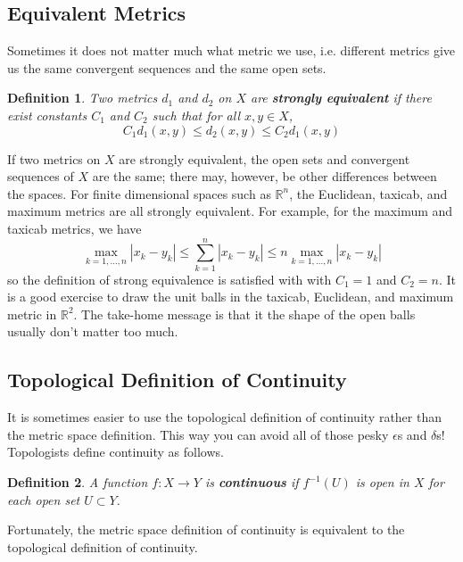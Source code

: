 \documentclass[12pt]{amsart}         %
\newtheorem{definition}{Definition}[section]
\theoremstyle{remark}
\newcommand{\R}{\mathbb{R}}
\begin{document}
\subsection{Equivalent Metrics}

Sometimes it does not matter much what metric we use, i.e. different metrics give us the same convergent sequences and the same open sets. 

\begin{definition}
Two metrics $d_1$ and $d_2$ on $X$ are \textbf{strongly equivalent} if there exist constants $C_1$ and $C_2$ such that for all $x, y \in X$,
\[
C_1 d_1(x,y) \leq d_2(x,y) \leq C_2 d_1(x,y)
\]
\end{definition}

If two metrics on $X$ are strongly equivalent, the open sets and convergent sequences of $X$ are the same; there may, however, be other differences between the spaces. For finite dimensional spaces such as $\R^n$, the Euclidean, taxicab, and maximum metrics are all strongly equivalent. For example, for the maximum and taxicab metrics, we have
\[
\max_{k=1, \dots, n}|x_k - y_k| \leq \sum_{k=1}^n |x_k - y_k| \leq n \max_{k=1, \dots, n}|x_k - y_k|
\]
so the definition of strong equivalence is satisfied with with $C_1 = 1$ and $C_2 = n$. It is a good exercise to draw the unit balls in the taxicab, Euclidean, and maximum metric in $\R^2$. The take-home message is that it the shape of the open balls usually don't matter too much.

\subsection{Topological Definition of Continuity}

It is sometimes easier to use the topological definition of continuity rather than the metric space definition. This way you can avoid all of those pesky $\epsilon$s and $\delta$s! Topologists define continuity as follows.

\begin{definition}
A function $f: X \rightarrow Y$ is \textbf{continuous} if $f^{-1}(U)$ is open in $X$ for each open set $U \subset Y$.
\end{definition}

Fortunately, the metric space definition of continuity is equivalent to the topological definition of continuity. 
\end{document}
